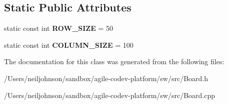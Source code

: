 \subsection*{Static Public Attributes}
\begin{DoxyCompactItemize}
\item 
\hypertarget{class_board_a4cd2277c8a8dbd23260f55d92abbf970}{static const int {\bfseries R\+O\+W\+\_\+\+S\+I\+Z\+E} = 50}\label{class_board_a4cd2277c8a8dbd23260f55d92abbf970}

\item 
\hypertarget{class_board_adfd96483c7ee6d2486c2b9b18b085fd0}{static const int {\bfseries C\+O\+L\+U\+M\+N\+\_\+\+S\+I\+Z\+E} = 100}\label{class_board_adfd96483c7ee6d2486c2b9b18b085fd0}

\end{DoxyCompactItemize}


The documentation for this class was generated from the following files\+:\begin{DoxyCompactItemize}
\item 
/\+Users/neiljohnson/sandbox/agile-\/codev-\/platform/sw/src/Board.\+h\item 
/\+Users/neiljohnson/sandbox/agile-\/codev-\/platform/sw/src/Board.\+cpp\end{DoxyCompactItemize}
